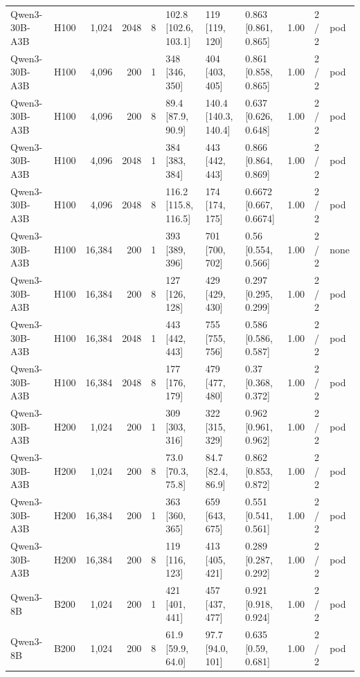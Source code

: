 \begin{landscape}
\begin{longtable}{llrrrlllrll}
Qwen3-30B-A3B & H100 & 1,024 & 2048 & 8 & 102.8 {[}102.6, 103.1{]} & 119 {[}119, 120{]} & 0.863 {[}0.861, 0.865{]} & 1.00 & 2 / 2 & pod \\
Qwen3-30B-A3B & H100 & 4,096 & 200 & 1 & 348 {[}346, 350{]} & 404 {[}403, 405{]} & 0.861 {[}0.858, 0.865{]} & 1.00 & 2 / 2 & pod \\
Qwen3-30B-A3B & H100 & 4,096 & 200 & 8 & 89.4 {[}87.9, 90.9{]} & 140.4 {[}140.3, 140.4{]} & 0.637 {[}0.626, 0.648{]} & 1.00 & 2 / 2 & pod \\
Qwen3-30B-A3B & H100 & 4,096 & 2048 & 1 & 384 {[}383, 384{]} & 443 {[}442, 443{]} & 0.866 {[}0.864, 0.869{]} & 1.00 & 2 / 2 & pod \\
Qwen3-30B-A3B & H100 & 4,096 & 2048 & 8 & 116.2 {[}115.8, 116.5{]} & 174 {[}174, 175{]} & 0.6672 {[}0.667, 0.6674{]} & 1.00 & 2 / 2 & pod \\
Qwen3-30B-A3B & H100 & 16,384 & 200 & 1 & 393 {[}389, 396{]} & 701 {[}700, 702{]} & 0.56 {[}0.554, 0.566{]} & 1.00 & 2 / 2 & none \\
Qwen3-30B-A3B & H100 & 16,384 & 200 & 8 & 127 {[}126, 128{]} & 429 {[}429, 430{]} & 0.297 {[}0.295, 0.299{]} & 1.00 & 2 / 2 & pod \\
Qwen3-30B-A3B & H100 & 16,384 & 2048 & 1 & 443 {[}442, 443{]} & 755 {[}755, 756{]} & 0.586 {[}0.586, 0.587{]} & 1.00 & 2 / 2 & pod \\
Qwen3-30B-A3B & H100 & 16,384 & 2048 & 8 & 177 {[}176, 179{]} & 479 {[}477, 480{]} & 0.37 {[}0.368, 0.372{]} & 1.00 & 2 / 2 & pod \\
Qwen3-30B-A3B & H200 & 1,024 & 200 & 1 & 309 {[}303, 316{]} & 322 {[}315, 329{]} & 0.962 {[}0.961, 0.962{]} & 1.00 & 2 / 2 & pod \\
Qwen3-30B-A3B & H200 & 1,024 & 200 & 8 & 73.0 {[}70.3, 75.8{]} & 84.7 {[}82.4, 86.9{]} & 0.862 {[}0.853, 0.872{]} & 1.00 & 2 / 2 & pod \\
Qwen3-30B-A3B & H200 & 16,384 & 200 & 1 & 363 {[}360, 365{]} & 659 {[}643, 675{]} & 0.551 {[}0.541, 0.561{]} & 1.00 & 2 / 2 & pod \\
Qwen3-30B-A3B & H200 & 16,384 & 200 & 8 & 119 {[}116, 123{]} & 413 {[}405, 421{]} & 0.289 {[}0.287, 0.292{]} & 1.00 & 2 / 2 & pod \\
Qwen3-8B & B200 & 1,024 & 200 & 1 & 421 {[}401, 441{]} & 457 {[}437, 477{]} & 0.921 {[}0.918, 0.924{]} & 1.00 & 2 / 2 & pod \\
Qwen3-8B & B200 & 1,024 & 200 & 8 & 61.9 {[}59.9, 64.0{]} & 97.7 {[}94.0, 101{]} & 0.635 {[}0.59, 0.681{]} & 1.00 & 2 / 2 & pod \\

\end{longtable}
\end{landscape}

